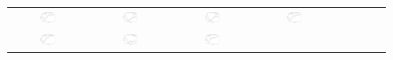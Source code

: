 \begin{figure}[h]
    \centering
    \begin{tabular}{@{}cccccccc@{}}
        \includegraphics[width=0.22\textwidth]{figures/training/video_16_true_vs_predicted.png} &
        \includegraphics[width=0.22\textwidth]{figures/training/video_19_true_vs_predicted.png} &
        \includegraphics[width=0.22\textwidth]{figures/training/video_21_true_vs_predicted.png} &
        \includegraphics[width=0.22\textwidth]{figures/training/video_24_true_vs_predicted.png} \\
        \includegraphics[width=0.22\textwidth]{figures/validation/video_12_true_vs_predicted.png} &
        \includegraphics[width=0.22\textwidth]{figures/validation/video_26_true_vs_predicted.png} &
        \includegraphics[width=0.22\textwidth]{figures/validation/video_28_true_vs_predicted.png} &

\end{tabular}
\end{figure}
